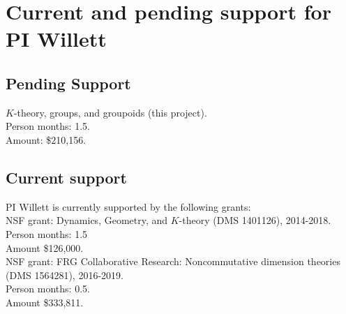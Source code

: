 \documentclass[11pt]{article}
\begin{document}
\section*{Current and pending support for PI Willett}



\subsection*{Pending Support}

$K$-theory, groups, and groupoids (this project).\\
Person months: 1.5.\\
Amount: \$210,156.\\


\subsection*{Current support}

PI Willett is currently supported by the following grants:\\

NSF grant: Dynamics, Geometry, and $K$-theory (DMS 1401126), 2014-2018.\\
Person months: 1.5\\
Amount \$126,000.\\

NSF grant: FRG Collaborative Research: Noncommutative dimension theories (DMS 1564281), 2016-2019.\\
Person months: 0.5.\\
Amount \$333,811.\\
\end{document}
